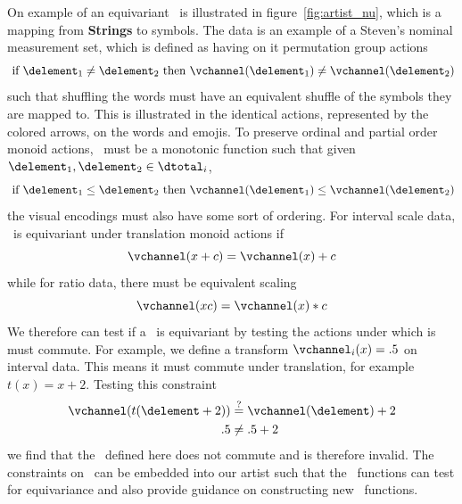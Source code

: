\documentclass[../main.tex]{subfiles}
\begin{document}
On example of an equivariant \vchannel\ is illustrated in figure~\ref{fig:artist_nu}, which is a mapping from \textbf{Strings} to symbols. The data is an example of a Steven's nominal measurement set, which is defined as having on it permutation group actions 
\begin{equation}
    \text{ if } \delement_1 \neq \delement_2 \text{ then } \vchannel (\delement_1) \neq\vchannel(\delement_2)
\end{equation}
such that shuffling the words must have an equivalent shuffle of the symbols they are mapped to. This is illustrated in the identical actions, represented by the colored arrows, on the words and emojis. To preserve ordinal and partial order monoid actions, \vchannel\ must be a monotonic function such that given $\delement_1, \delement_2 \in \dtotal_{i}$,
\begin{equation}
\text{ if } \delement_1 \leq \delement_2 \text{ then } \vchannel (\delement_1) \leq \vchannel(\delement_2)
\end{equation}
the visual encodings must also have some sort of ordering. For interval scale data, \vchannel\ is equivariant under translation monoid actions if 
\begin{equation}
\vchannel (x + c) = \vchannel(x) + c
\end{equation}
while for ratio data, there must be equivalent scaling\cite{weissteinSimilarityTransformation} 
\begin{equation}
\vchannel(xc) = \vchannel(x)*c 
\end{equation}
We therefore can test if a \vchannel\ is equivariant by testing the actions under which is must  commute. For example, we define a transform $\vchannel_{i}(x) = .5$ on interval data. This means it must commute under translation, for example $t(x) = x+2$. Testing this constraint 
\begin{align}
    \vchannel(t(\delement + 2)) & \overset{?}{=} \vchannel(\delement) + 2\\
    .5 &\neq .5 + 2
\end{align}
we find that the \vchannel\ defined here does not commute and is therefore invalid. The constraints on \vchannel\ can be embedded into our artist such that the \vchannel\ functions can test for equivariance and also provide guidance on constructing new \vchannel\ functions. 
\end{document}
